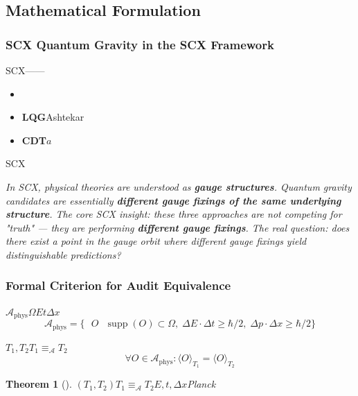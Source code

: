\documentclass[12pt,a4paper]{article}
\newtheorem{theorem}{Theorem}[section]
\theoremstyle{remark}
\newcommand{\A}{\mathcal{A}}
\DeclareMathOperator{\supp}{supp}
\begin{document}
\subsection{ Mathematical Formulation}

\subsubsection{SCX Quantum Gravity in the SCX Framework}

SCX\textbf{}——\textbf{}

\begin{itemize}
    \item \textbf{}
    \item \textbf{LQG}Ashtekar
    \item \textbf{CDT}$a$
\end{itemize}

SCX\"\"\textbf{}

\medskip
\noindent\textit{In SCX, physical theories are understood as \textbf{gauge structures}. Quantum gravity candidates are essentially \textbf{different gauge fixings of the same underlying structure}. The core SCX insight: these three approaches are not competing for "truth" — they are performing \textbf{different gauge fixings}. The real question: does there exist a point in the gauge orbit where different gauge fixings yield distinguishable predictions?}

\subsubsection{ Formal Criterion for Audit Equivalence}

\textbf{}$\A_{\text{phys}}$$\Omega$$E$$t$$\Delta x$
\begin{equation}
    \A_{\text{phys}} = \{\text{ } O \text{  } \supp(O) \subset \Omega, \; \Delta E \cdot \Delta t \geq \hbar/2, \; \Delta p \cdot \Delta x \geq \hbar/2\}
\end{equation}

$T_1, T_2$\textbf{}$T_1 \equiv_{\A} T_2$
\begin{equation}
    \forall O \in \A_{\text{phys}}: \langle O \rangle_{T_1} = \langle O \rangle_{T_2}
\end{equation}



\begin{theorem}[]
$(T_1, T_2)$$T_1 \equiv_{\A} T_2$$E, t, \Delta x$Planck
\end{theorem}
\end{document}
